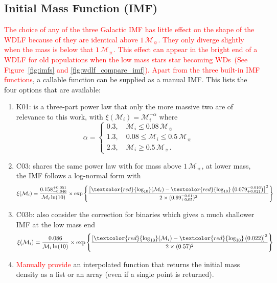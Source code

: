 \documentclass[fleqn,usenatbib]{rasti}
\newcommand{\msun}{\mathcal{M}_{\sun}}
\begin{document}
\subsection{Initial Mass Function (IMF)}
\textcolor{red}{The choice of any of the three Galactic IMF has little effect on
the shape of the WDLF because of they are identical above $1\,\msun$. They only
diverge  slightly when the mass is below that $1\,\msun$. This effect can appear
in the bright end of a WDLF for old populations when the low mass stars star
becoming WDs~(See Figure~\ref{fig:imfs} and \ref{fig:wdlf_compare_imf}). Apart
from the three built-in IMF functions}, a callable function can be supplied as
a manual IMF. This lists the four options that are available:

\begin{enumerate}
    \item K01: \citet{2001MNRAS.322..231K} is a three-part power law that only the
    more massive two are of relevance to this work, with
    $\xi(\mathcal{M}_i) = \mathcal{M}_i^{-\alpha}$ where
    \begin{equation}
        \alpha =
        \begin{cases}
            0.3, \quad \mathcal{M}_i \leq 0.08\,\msun\\
            1.3, \quad 0.08 \leq \mathcal{M}_i \leq 0.5\,\msun\\
            2.3, \quad \mathcal{M}_i \geq 0.5\,\msun.
        \end{cases}
    \end{equation}
    \item C03: \citet{2003PASP..115..763C} shares the same power law with
    \citet{2001MNRAS.322..231K} for mass above $1\,\msun$, at lower mass,
    the IMF follows a log-normal form with
    \begin{equation}
        \xi(\mathcal{M}_i) = \dfrac{0.158^{+0.051}_{-0.046}}{\mathcal{M}_i \ln(10)} \times
            \exp{\left\{\dfrac{\left[\textcolor{red}{\log_{10}}(\mathcal{M}_i) - \textcolor{red}{\log_{10}}\left(0.079^{-0.016}_{+0.021}\right)\right]^2}{2 \times (0.69^{-0.01}_{+0.05})^2}\right\}}
    \end{equation}
    \item C03b: \citet[][including binary]{2003PASP..115..763C} also consider the correction for binaries which gives a much shallower IMF at the low mass end
    \begin{equation}
        \xi(\mathcal{M}_i) = \dfrac{0.086}{\mathcal{M}_i \ln(10)} \times
            \exp{\left\{\dfrac{\left[\textcolor{red}{\log_{10}}(\mathcal{M}_i) - \textcolor{red}{\log_{10}}\left(0.022\right)\right]^2}{2 \times (0.57)^2}\right\}}
    \end{equation}
    \item \textcolor{red}{Manually provide} an interpolated function that returns the initial mass density as a list or an array (even if a single point is returned).
\end{enumerate}
\end{document}
